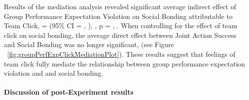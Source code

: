 \documentclass[english]{article}\usepackage[]{graphicx}\usepackage[]{color}
\newcommand{\myparagraph}[1]{\paragraph{#1}\mbox{}\\}
\newcommand{\betavec}{{\bm\beta = }}
\newcommand{\CIstart}{(95\% CI =}
\newcommand{\CIfinish}{),}
\newcommand{\pvalue}{p =}
\begin{document}
Results of the mediation analysis revealed significant average indirect effect of Group Performance Expectation Violation on Social Bonding attributable to Team Click,
  \betavec
  \CIstart
  ,
  \CIfinish
  ,
  \pvalue
  ,
  .
When controlling for the effect of team click on social bonding, the average direct effect between Joint Action Success and Social Bonding was no longer significant, \Sexpr{} (see Figure ~\ref{fig:groupPerfExpClickMediationPlot}).  These results suggest that feelings of team click fully mediate the relationship between group performance expectation violation and and social bonding.




\myparagraph{Discussion of post-Experiment results}
\end{document}
